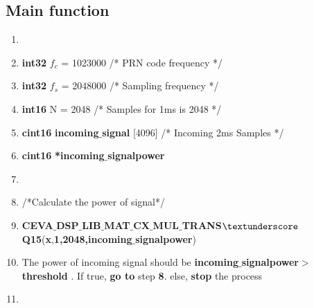 \documentclass[journal,10pt,onecolumn]{article}
\begin{document}
\subsection{Main function}
\begin{enumerate} 
\item[]   

\item[] \textbf{int32} $f_c$ = 1023000 \hspace{5mm} /* PRN code frequency */
\item[] \textbf{int32} $f_s$ = 2048000 \hspace{5mm} /* Sampling frequency */ 
\item[] \textbf{int16} N = 2048        \hspace{5mm} /* Samples for 1ms is 2048 */ 
\item[] \textbf{cint16} \textbf{incoming$\_$signal} [4096] \hspace{5mm} /* Incoming 2ms  Samples  */  
\item[] \textbf{cint16} \textbf{*incoming$\_$signalpower}
\item []
\item[] /*Calculate the power of signal*/
\item[] \textbf{CEVA$\_$DSP$\_$LIB$\_$MAT$\_$CX$\_$MUL$\_$TRANS$\textunderscore$Q15}(\textbf{x},\textbf{1,2048,incoming$\_$signalpower})  
\item[] The power of incoming signal should be \textbf{ incoming$\_$signalpower$>$ threshold} . If true, \textbf{go to} step \textbf{8}. else, \textbf{stop} the process
\item[] 

   
    

\end{enumerate}
\end{document}
